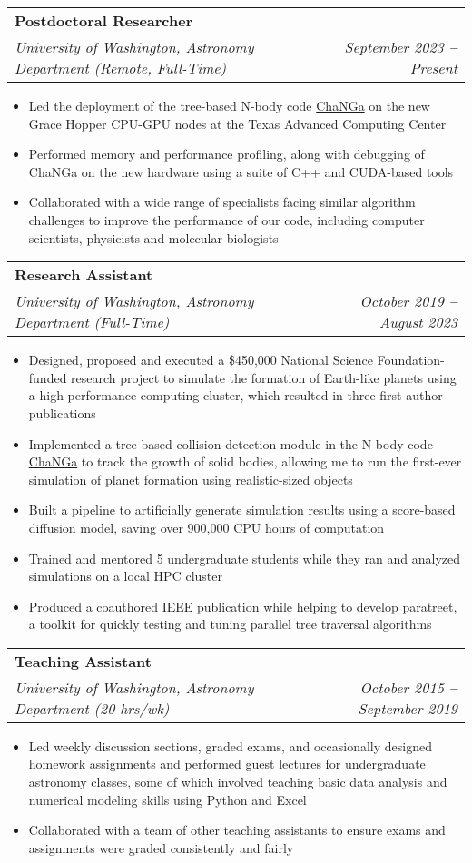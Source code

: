 \documentclass[letterpaper,11pt]{article}
\makeatletter
\newcommand{\resumeItem}[1]{
  \item\small{
    {#1 \vspace{-2pt}}
  }
}
\newcommand{\resumeSubheading}[4]{
  \vspace{-2pt}\item
    \begin{tabular*}{0.97\textwidth}[t]{l@{\extracolsep{\fill}}r}
      \textbf{#1} & #2 \\
      \textit{\small#3} & \textit{\small #4} \\
    \end{tabular*}\vspace{-7pt}
}
\newcommand{\resumeItemListStart}{\begin{itemize}}
\newcommand{\resumeItemListEnd}{\end{itemize}\vspace{-5pt}}
\makeatother
\begin{document}
    \resumeSubheading
      {Postdoctoral Researcher}{}
      {University of Washington, Astronomy Department (Remote, Full-Time)}{September 2023 \textbf{--} Present}
        \resumeItemListStart
        	   \resumeItem{Led the deployment of the tree-based N-body code {\sc \href{https://github.com/N-BodyShop/changa}{ChaNGa}} on the new Grace Hopper CPU-GPU nodes at the Texas Advanced Computing Center}
	   \resumeItem{Performed memory and performance profiling, along with debugging of ChaNGa on the new hardware using a suite of C++ and CUDA-based tools}
	   \resumeItem{Collaborated with a wide range of specialists facing similar algorithm challenges to improve the performance of our code, including computer scientists, physicists and molecular biologists}
        \resumeItemListEnd
        
     \resumeSubheading
      {Research Assistant}{}
      {University of Washington, Astronomy Department (Full-Time)}{October 2019 \textbf{--} August 2023}
        \resumeItemListStart
        	   \resumeItem{Designed, proposed and executed a \$450,000 National Science Foundation-funded research project to simulate the formation of Earth-like planets using a high-performance computing cluster, which resulted in three first-author publications}
	   \resumeItem{Implemented a tree-based collision detection module in the N-body code  {\sc \href{https://github.com/N-BodyShop/changa}{ChaNGa}} to track the growth of solid bodies, allowing me to run the first-ever simulation of planet formation using realistic-sized objects}
	   \resumeItem{Built a pipeline to artificially generate simulation results using a score-based diffusion model, saving over 900,000 CPU hours of computation}
	   \resumeItem{Trained and mentored 5 undergraduate students while they ran and analyzed simulations on a local HPC cluster}
	   \resumeItem{Produced a coauthored \href{https://doi.org/10.1109/IPDPS53621.2022.00079}{IEEE publication} while helping to develop {\sc \href{https://paratreet.github.io/}{paratreet}}, a toolkit for quickly testing and tuning parallel tree traversal algorithms}
        \resumeItemListEnd
        
       \resumeSubheading
      {Teaching Assistant}{}
      {University of Washington, Astronomy Department (20 hrs/wk)}{October 2015 \textbf{--} September 2019}
        \resumeItemListStart
        	   \resumeItem{Led weekly discussion sections, graded exams, and occasionally designed homework assignments and performed guest lectures for undergraduate astronomy classes, some of which involved teaching basic data analysis and numerical modeling skills using Python and Excel}
	   \resumeItem{Collaborated with a team of other teaching assistants to ensure exams and assignments were graded consistently and fairly}
        \resumeItemListEnd
        
\end{document}
